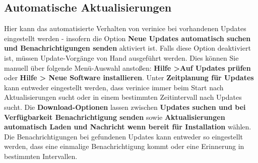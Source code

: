 \documentclass[a4paper,10pt]{book}
\begin{document}
\subsection{Automatische Aktualisierungen}
Hier kann das automatisierte Verhalten von verinice bei vorhandenen Updates eingestellt werden - insofern die Option \textbf{Neue Updates
automatisch suchen und Benachrichtigungen senden} aktiviert ist. Falls diese Option deaktiviert ist, müssen Update-Vorgänge von
Hand ausgeführt werden. Dies können Sie manuell über folgende Menü-Auswahl anstoßen: \textbf{Hilfe \textgreater Auf Updates prüfen} oder \textbf{Hilfe \textgreater
Neue Software installieren}. Unter \textbf{Zeitplanung für Updates} kann entweder eingestellt werden, dass verinice immer beim Start nach
Aktualisierungen sucht oder in einem bestimmten Zeitintervall nach Updates sucht. Die \textbf{Download-Optionen} lassen zwischen \textbf{Updates
suchen und bei Verfügbarkeit Benachrichtigung senden} sowie \textbf{Aktualisierungen automatisch Laden und Nachricht wenn bereit für
Installation} wählen. Die Benachrichtigungen bei gefundenen Updates kann entweder so eingestellt werden, dass eine einmalige
Benachrichtigung kommt oder eine Erinnerung in bestimmten Intervallen.
\end{document}
